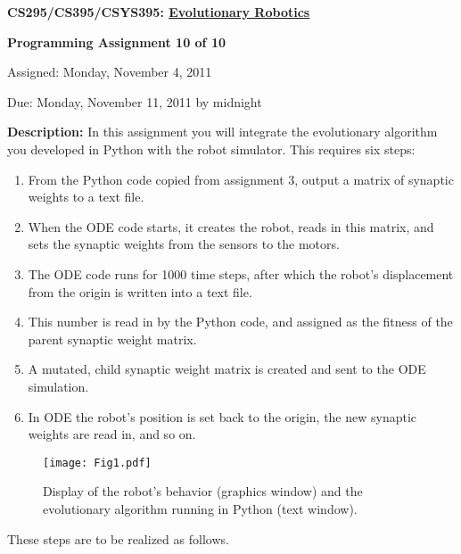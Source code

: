 \documentclass[12pt]{article}
\begin{document}
\centerline{\bf \Large CS295/CS395/CSYS395: \href{CS295_395_Syllabus.pdf}{\underline{Evolutionary Robotics}}}

\vspace{0.5cm}

\centerline{\bf \large Programming Assignment 10 of 10}

\vspace{0.5cm}

\centerline{\large Assigned: Monday, November 4, 2011}

\vspace{0.5cm}

\centerline{\large Due: Monday, November 11, 2011 by midnight}

\vspace{0.5cm}

\noindent \textbf{Description:} In this assignment you will integrate the evolutionary algorithm you developed in Python with the robot simulator. This requires six steps:

\begin{enumerate}
\item From the Python code copied from assignment 3, output a matrix of synaptic weights to a text file.
\item When the ODE code starts, it creates the robot, reads in this matrix, and sets the synaptic weights from the sensors to the motors.
\item The ODE code runs for 1000 time steps, after which the robot's displacement from the origin is written into a text file.
\item This number is read in by the Python code, and assigned as the fitness of the parent synaptic weight matrix.
\item A mutated, child synaptic weight matrix is created and sent to the ODE simulation.
\item In ODE the robot's position is set back to the origin, the new synaptic weights are read in, and so on.
\end{enumerate}

\begin{figure}
\centerline{
\texttt{[image: Fig1.pdf]}}
\caption{Display of the robot's behavior (graphics window) and the evolutionary algorithm running in Python (text window).}
\label{Fig1}
\end{figure}

These steps are to be realized as follows.
\end{document}
